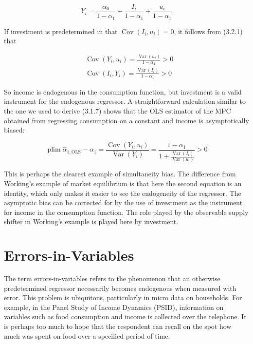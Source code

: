 \documentclass[10pt]{article}
\begin{document}
\begin{equation*}
Y_{i}=\frac{\alpha_{0}}{1-\alpha_{1}}+\frac{I_{i}}{1-\alpha_{1}}+\frac{u_{i}}{1-\alpha_{1}} \tag{3.2.1}
\end{equation*}


If investment is predetermined in that $\operatorname{Cov}\left(I_{i}, u_{i}\right)=0$, it follows from (3.2.1) that

$$
\begin{aligned}
& \operatorname{Cov}\left(Y_{i}, u_{i}\right)=\frac{\operatorname{Var}\left(u_{i}\right)}{1-\alpha_{1}}>0 \\
& \operatorname{Cov}\left(I_{i}, Y_{i}\right)=\frac{\operatorname{Var}\left(I_{i}\right)}{1-\alpha_{1}}>0
\end{aligned}
$$

So income is endogenous in the consumption function, but investment is a valid instrument for the endogenous regressor. A straightforward calculation similar to the one we used to derive (3.1.7) shows that the OLS estimator of the MPC obtained from regressing consumption on a constant and income is asymptotically biased:


\begin{equation*}
\operatorname{plim} \hat{\alpha}_{1, \mathrm{OLS}}-\alpha_{1}=\frac{\operatorname{Cov}\left(Y_{i}, u_{i}\right)}{\operatorname{Var}\left(Y_{i}\right)}=\frac{1-\alpha_{1}}{1+\frac{\operatorname{Var}\left(I_{i}\right)}{\operatorname{Var}\left(u_{i}\right)}}>0 \tag{3.2.2}
\end{equation*}


This is perhaps the clearest example of simultaneity bias. The difference from Working's example of market equilibrium is that here the second equation is an identity, which only makes it easier to see the endogeneity of the regressor. The asymptotic bias can be corrected for by the use of investment as the instrument for income in the consumption function. The role played by the observable supply shifter in Working's example is played here by investment.

\section*{Errors-in-Variables}
The term errors-in-variables refers to the phenomenon that an otherwise predetermined regressor necessarily becomes endogenous when measured with error. This problem is ubiquitous, particularly in micro data on households. For example, in the Panel Study of Income Dynamics (PSID), information on variables such as food consumption and income is collected over the telephone. It is perhaps too much to hope that the respondent can recall on the spot how much was spent on food over a specified period of time.
\end{document}
